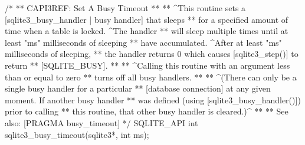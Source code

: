 \begin{Codex}[label=sqlite3.h,numbers=left]
{/*
** CAPI3REF: Set A Busy Timeout
**
** ^This routine sets a [sqlite3_busy_handler | busy handler] that sleeps
** for a specified amount of time when a table is locked.  ^The handler
** will sleep multiple times until at least "ms" milliseconds of sleeping
** have accumulated.  ^After at least "ms" milliseconds of sleeping,
** the handler returns 0 which causes [sqlite3_step()] to return
** [SQLITE_BUSY].
**
** ^Calling this routine with an argument less than or equal to zero
** turns off all busy handlers.
**
** ^(There can only be a single busy handler for a particular
** [database connection] at any given moment.  If another busy handler
** was defined  (using [sqlite3_busy_handler()]) prior to calling
** this routine, that other busy handler is cleared.)^
**
** See also:  [PRAGMA busy_timeout]
*/
SQLITE_API int sqlite3_busy_timeout(sqlite3*, int ms);

}
\end{Codex}
